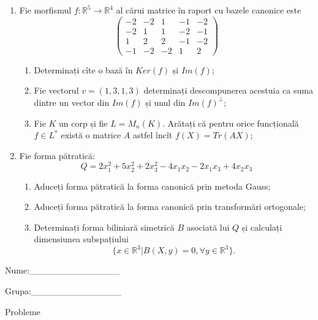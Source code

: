 \documentclass{article}
\begin{document}
\begin{enumerate}
 \item Fie morfismul $f:\mathbb{R}^5 \to \mathbb{R}^4$ al cărui matrice în raport cu bazele canonice este
$$\begin{pmatrix}
-2&-2&1&-1&-2\\
-2&1&1&-2&-1\\
1&2&2&-1&-2\\
-1&-2&-2&1&2
\end{pmatrix}$$

\begin{enumerate}
\item Determinați cîte o bază în $Ker(f)$ și $Im(f)$;
\item Fie vectorul $v=(1,3,1,3)$ determinați descompunerea acestuia ca suma dintre un vector din $Im(f)$ și unul din $Im(f)^\perp$;
\item Fie $K$ un corp și fie $L=M_n(K)$. Arătați că pentru orice funcțională $f \in L^*$ există o matrice $A$ astfel încît $f(X)=Tr(AX)$;
\end{enumerate}
\item Fie forma pătratică:
$$Q= 2x_1^2+5x_2^2+2x_3^2-4x_1x_2-2x_1x_3+4x_2x_3$$

\begin{enumerate}
\item Aduceți forma pătratică la forma canonică prin metoda Gauss;
\item Aduceți forma pătratică la forma canonică prin transformări ortogonale;
\item Determinați forma biliniară simetrică $B$ asociată lui $Q$ și calculați dimensiunea subspațiului
$$\{x \in \mathbb{R}^3 | B(X,y)=0,\forall y \in \mathbb{R}^3\}.$$

\end{enumerate}
\end{enumerate}
\newpage
\begin{flushright}
Nume:\_\_\_\_\_\_\_\_\_\_\_\_\_\_
 
 
Grupa:\_\_\_\_\_\_\_\_\_\_\_\_\_\_
\end{flushright}
\begin{center}
\vspace{2cm}
{\Large Probleme}
\vspace{2cm}
\end{center}
\end{document}
